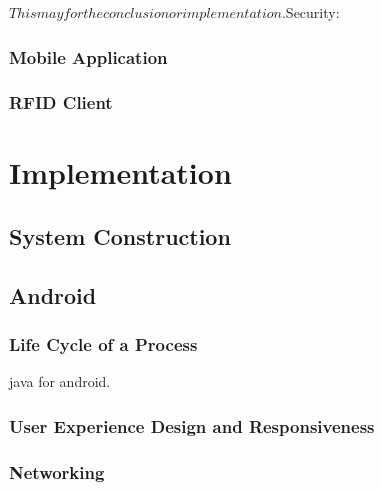 \documentclass[a4paper, 11pt]{article}
\begin{document}



\(This may for the conclusion or implementation.\)Security:

\subsubsection{Mobile Application} 

\subsubsection{RFID Client} %

\section{Implementation}

\subsection{System Construction}
\subsection{Android} 

\subsubsection{Life Cycle of a Process}
java for android.

\subsubsection{User Experience Design and Responsiveness}

\subsubsection{Networking}
\end{document}
